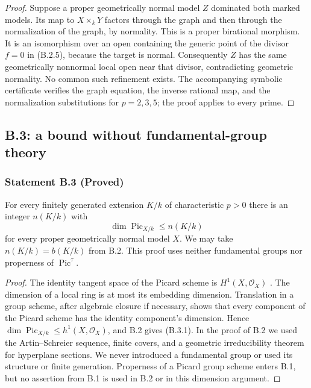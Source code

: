 \begin{proof}
Suppose a proper geometrically normal model $Z$ dominated both
marked models.  Its map to $X\times_kY$ factors through the graph
and then through the normalization of the graph, by normality.
This is a proper birational morphism.  It is an isomorphism over
an open containing the generic point of the divisor $f=0$ in
(B.2.5), because the target is normal.  Consequently $Z$ has the
same geometrically nonnormal local open near that divisor,
contradicting geometric normality.  No common such refinement exists.
The accompanying symbolic certificate verifies the graph equation,
the inverse rational map, and the normalization substitutions for
$p=2,3,5$; the proof applies to every prime.
\end{proof}

\subsection{B.3: a bound without fundamental-group theory}

\subsubsection*{Statement B.3 (Proved)}
For every finitely generated extension $K/k$ of characteristic
$p>0$ there is an integer $n(K/k)$ with
\[
 \dim\operatorname{Pic}_{X/k}\leq n(K/k)
 \tag{B.3.1}
\]
for every proper geometrically normal model $X$.  We may take
$n(K/k)=b(K/k)$ from B.2.  This proof uses neither fundamental
groups nor properness of $\operatorname{Pic}^{\tau}$.
\begin{proof}
The identity tangent space of the Picard scheme is
$H^1(X,\mathcal O_X)$
\cite[Theorem 5.11 and Corollary 5.13]{Kleiman2005}.
The dimension of a local ring is at most its embedding
dimension.  Translation in a group scheme, after algebraic
closure if necessary, shows that every component of the
Picard scheme has the identity component's dimension.
Hence
$\dim\operatorname{Pic}_{X/k}\leq h^1(X,\mathcal O_X)$,
and B.2 gives (B.3.1).  In the proof of B.2 we used the
Artin--Schreier sequence, finite covers, and a geometric
irreducibility theorem for hyperplane sections.  We never
introduced a fundamental group or used its structure or
finite generation.  Properness of a Picard group scheme
enters B.1, but no assertion from B.1 is used in B.2 or in
this dimension argument.
\end{proof}

